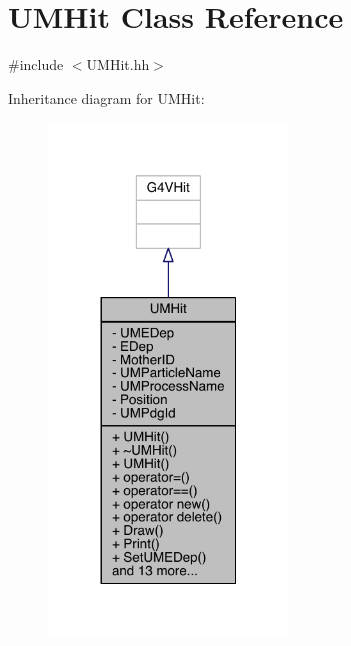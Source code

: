 \hypertarget{classUMHit}{}\section{U\+M\+Hit Class Reference}
\label{classUMHit}


{\ttfamily \#include $<$U\+M\+Hit.\+hh$>$}



Inheritance diagram for U\+M\+Hit\+:
\nopagebreak
\begin{figure}[H]
\begin{center}
\leavevmode
\includegraphics[width=180pt]{classUMHit__inherit__graph}
\end{center}
\end{figure}


